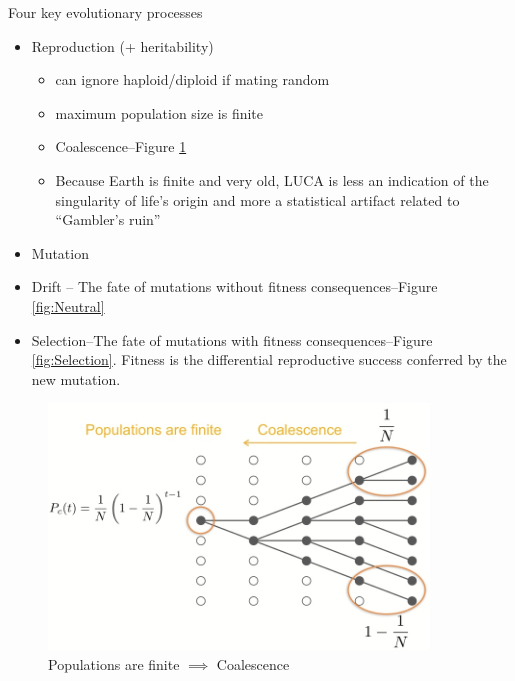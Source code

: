 \documentclass[]{article}
\begin{document}
Four key evolutionary processes
\begin{itemize}
	\item Reproduction (+ heritability)
	\begin{itemize}
		\item can ignore haploid/diploid if mating random
		\item maximum population size is finite
		\item Coalescence--Figure \ref{fig:Coalescence}
		\item Because Earth is finite and very old, LUCA is less an
		indication of the singularity of life’s origin and more a
		statistical artifact related to “Gambler’s ruin” 
	\end{itemize}
	\item Mutation
	\item Drift -- The fate of mutations without fitness consequences--Figure \ref{fig:Neutral} 
	\item Selection--The fate of mutations with fitness consequences--Figure \ref{fig:Selection}. Fitness is the differential reproductive
	success conferred by the new mutation.
\end{itemize}

\begin{figure}[H]
	\caption{Populations are finite $\implies$ Coalescence}\label{fig:Coalescence}
	\includegraphics[width=0.9\textwidth]{Coalescence}
\end{figure}
\end{document}
